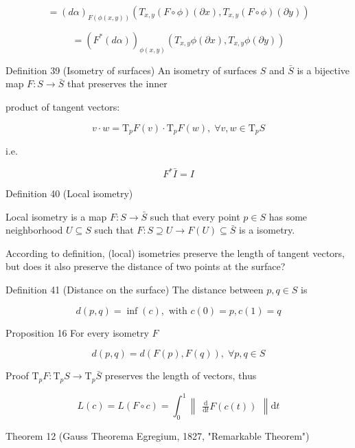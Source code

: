\documentclass[lang=cn,a4paper,11pt,openany,twoside]{elegantbook}
\begin{document}
\[
= {\left( d\alpha \right) }_{F\left( {\phi \left( {x,y}\right) }\right) }\left( {{T}_{x,y}\left( {F \circ  \phi }\right) \left( {\partial x}\right) ,{T}_{x,y}\left( {F \circ  \phi }\right) \left( {\partial y}\right) }\right)
\]

\[
= {\left( {F}^{ * }\left( d\alpha \right) \right) }_{\phi \left( {x,y}\right) }\left( {{T}_{x,y}\phi \left( {\partial x}\right) ,{T}_{x,y}\phi \left( {\partial y}\right) }\right)
\]

Definition 39 (Isometry of surfaces) An isometry of surfaces \(S\) and \(\bar{S}\) is a bijective map \(F : S \rightarrow  \bar{S}\) that preserves the inner

product of tangent vectors:

\[
v \cdot  w = {\mathrm{T}}_{p}F\left( v\right)  \cdot  {\mathrm{T}}_{p}F\left( w\right) ,\;\forall v,w \in  {\mathrm{T}}_{p}S
\]

i.e.

\[
{F}^{ * }\bar{I} = I
\]

Definition 40 (Local isometry)

Local isometry is a map \(F : S \rightarrow  \bar{S}\) such that every point \(p \in  S\) has some neighborhood \(U \subseteq  S\) such that \(F : S \supseteq  U \rightarrow  F\left( U\right)  \subseteq  \bar{S}\) is a isometry.

According to definition, (local) isometries preserve the length of tangent vectors, but does it also preserve the distance of two points at the surface?

Definition 41 (Distance on the surface) The distance between \(p,q \in  S\) is

\[
d\left( {p,q}\right)  = \inf \left( c\right) ,\text{ with }c\left( 0\right)  = p,c\left( 1\right)  = q
\]

Proposition 16 For every isometry \(F\)

\[
d\left( {p,q}\right)  = d\left( {F\left( p\right) ,F\left( q\right) }\right) ,\;\forall p,q \in  S
\]

Proof \({\mathrm{T}}_{p}F : {\mathrm{T}}_{p}S \rightarrow  {\mathrm{T}}_{p}\bar{S}\) preserves the length of vectors, thus

\[
L\left( c\right)  = L\left( {F \circ  c}\right)  = {\int }_{0}^{1}\begin{Vmatrix}{\frac{\mathrm{d}}{\mathrm{d}t}F\left( {c\left( t\right) }\right) }\end{Vmatrix}\mathrm{d}t
\]

Theorem 12 (Gauss Theorema Egregium, 1827, "Remarkable Theorem")
\end{document}
